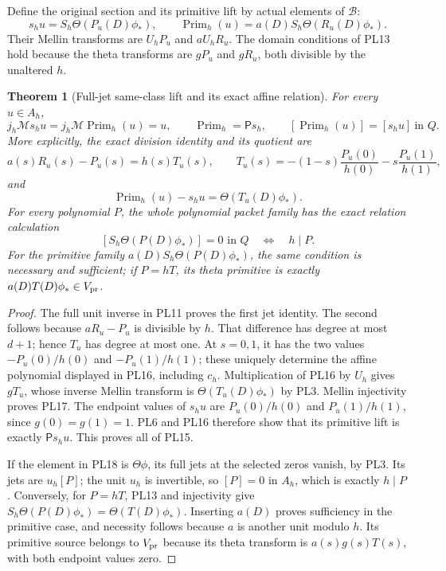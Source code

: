 \documentclass[11pt,a4paper]{article}
\newtheorem{theorem}{Theorem}[section]
\theoremstyle{definition}\newtheorem{definition}[theorem]{Definition}
\begin{document}
Define the original section and its primitive lift by actual elements
of \(\mathscr B\):
\[
 s_hu=S_h\Theta(P_u(D)\phi_*),\qquad
 \operatorname{Prim}_h(u)=a(D)S_h\Theta(R_u(D)\phi_*).
 \tag{PL14}\label{pl:pl:lift}
\]
Their Mellin transforms are \(U_hP_u\) and \(aU_hR_u\).
The domain conditions of PL13 hold because the theta transforms are
\(gP_u\) and \(gR_u\), both divisible by the unaltered \(h\).

\begin{theorem}[Full-jet same-class lift and its exact affine relation]
\label{pl:thm:primitive}
For every \(u\in A_h\),
\[
 j_h\mathcal M s_hu=j_h\mathcal M\operatorname{Prim}_h(u)=u,\qquad
 \operatorname{Prim}_h=\mathsf P s_h,\qquad
 [\operatorname{Prim}_h(u)]=[s_hu]\ \text{in }Q.
 \tag{PL15}\label{pl:pl:sameclass}
\]
More explicitly, the exact division identity and its quotient are
\[
 a(s)R_u(s)-P_u(s)=h(s)T_u(s),\qquad
 T_u(s)=-(1-s)\frac{P_u(0)}{h(0)}-s\frac{P_u(1)}{h(1)},
 \tag{PL16}\label{pl:pl:affine}
\]
and
\[
 \operatorname{Prim}_h(u)-s_hu=\Theta(T_u(D)\phi_*).
 \tag{PL17}\label{pl:pl:exactrelation}
\]
For every polynomial \(P\), the whole polynomial packet family has
the exact relation calculation
\[
 [S_h\Theta(P(D)\phi_*)]=0\text{ in }Q
       \quad\Longleftrightarrow\quad h\mid P.
 \tag{PL18}\label{pl:pl:allrelations}
\]
For the primitive family \(a(D)S_h\Theta(P(D)\phi_*)\), the same
condition is necessary and sufficient; if \(P=hT\), its theta
primitive is exactly \(a(D)T(D)\phi_*\in V_{\rm pr}\).
\end{theorem}
\begin{proof}
The full unit inverse in PL11 proves the first jet identity.
The second follows because \(aR_u-P_u\) is divisible by \(h\).
That difference has degree at most \(d+1\); hence \(T_u\) has degree
at most one. At \(s=0,1\), it has the two values
\(-P_u(0)/h(0)\) and \(-P_u(1)/h(1)\); these uniquely determine
the affine polynomial displayed in PL16, including \(c_h\).
Multiplication of PL16 by \(U_h\) gives \(gT_u\), whose inverse
Mellin transform is \(\Theta(T_u(D)\phi_*)\) by PL3. Mellin
injectivity proves PL17.
The endpoint values of \(s_hu\) are \(P_u(0)/h(0)\) and
\(P_u(1)/h(1)\), since \(g(0)=g(1)=1\).
PL6 and PL16 therefore show that its primitive lift is exactly
\(\mathsf P s_hu\). This proves all of PL15.

If the element in PL18 is \(\Theta\phi\), its full jets at the
selected zeros vanish, by PL3. Its jets are \(u_h[P]\);
the unit \(u_h\) is invertible, so \([P]=0\) in \(A_h\), which is
exactly \(h\mid P\). Conversely, for \(P=hT\), PL13 and injectivity
give \(S_h\Theta(P(D)\phi_*)=\Theta(T(D)\phi_*)\).
Inserting \(a(D)\) proves sufficiency in the primitive case, and
necessity follows because \(a\) is another unit modulo \(h\).
Its primitive source belongs to \(V_{\rm pr}\) because its theta
transform is \(a(s)g(s)T(s)\), with both endpoint values zero.
\end{proof}
\end{document}
